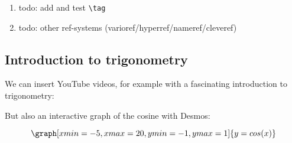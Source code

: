 \documentclass{ximera}
\begin{document}
\begin{enumerate}
	\item todo: add and test \verb|\tag|
	\item todo: other ref-systems (varioref/hyperref/nameref/cleveref) 
\end{enumerate}


 \label{sec:showCase:integratie}

\subsection{Introduction to trigonometry}

We can insert YouTube videos, for example with a fascinating introduction to trigonometry:
\begin{center}
\end{center}


But also an interactive graph of the cosine with Desmos:

\[  
\graph[xmin=-5,xmax=20,ymin=-1,ymax=1]{y=cos(x)}  
\] 

\end{document}
